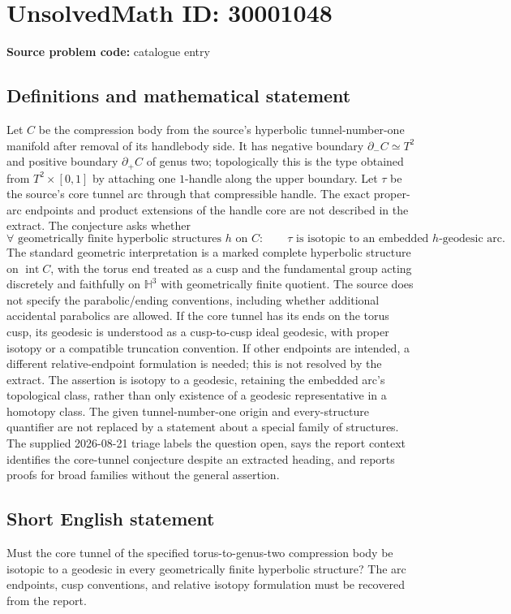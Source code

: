 \documentclass[11pt]{article}
\begin{document}
\section*{UnsolvedMath ID: 30001048}
\textbf{Source problem code:} catalogue entry
\subsection{Definitions and mathematical statement}
Let $C$ be the compression body from the source's hyperbolic tunnel-number-one manifold after removal of its handlebody side. It has negative boundary $\partial_-C\simeq T^2$ and positive boundary $\partial_+C$ of genus two; topologically this is the type obtained from $T^2\times[0,1]$ by attaching one $1$-handle along the upper boundary. Let $\tau$ be the source's core tunnel arc through that compressible handle. The exact proper-arc endpoints and product extensions of the handle core are not described in the extract. The conjecture asks whether \[\forall\text{ geometrically finite hyperbolic structures }h\text{ on }C:\qquad\tau\text{ is isotopic to an embedded }h\text{-geodesic arc}.\] The standard geometric interpretation is a marked complete hyperbolic structure on $\operatorname{int}C$, with the torus end treated as a cusp and the fundamental group acting discretely and faithfully on $\mathbb H^3$ with geometrically finite quotient. The source does not specify the parabolic/ending conventions, including whether additional accidental parabolics are allowed. If the core tunnel has its ends on the torus cusp, its geodesic is understood as a cusp-to-cusp ideal geodesic, with proper isotopy or a compatible truncation convention. If other endpoints are intended, a different relative-endpoint formulation is needed; this is not resolved by the extract. The assertion is isotopy to a geodesic, retaining the embedded arc's topological class, rather than only existence of a geodesic representative in a homotopy class. The given tunnel-number-one origin and every-structure quantifier are not replaced by a statement about a special family of structures. The supplied 2026-08-21 triage labels the question open, says the report context identifies the core-tunnel conjecture despite an extracted heading, and reports proofs for broad families without the general assertion.
\subsection{Short English statement}
Must the core tunnel of the specified torus-to-genus-two compression body be isotopic to a geodesic in every geometrically finite hyperbolic structure? The arc endpoints, cusp conventions, and relative isotopy formulation must be recovered from the report.
\end{document}

